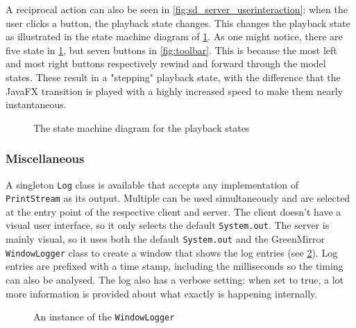 \documentclass[a4paper]{article}
\begin{document}
	A reciprocal action can also be seen in \cref{fig:sd_server_userinteraction}: when the user clicks a button, the playback state changes. This changes the playback state as illustrated in the state machine diagram of \cref{fig:smd_playbackstates}. As one might notice, there are five state in \cref{fig:smd_playbackstates}, but seven buttons in \cref{fig:toolbar}. This is because the most left and most right buttons respectively rewind and forward through the model states. These result in a "stepping" playback state, with the difference that the JavaFX transition is played with a highly increased speed to make them nearly instantaneous.
	\begin{figure}[H]
		\centering
		\caption{The state machine diagram for the playback states}
		\label{fig:smd_playbackstates}
	\end{figure}
	
	
	\subsubsection{Miscellaneous}\label{subsubsec:misc}
	A singleton \lstinline{Log} class is available that accepts any implementation of \lstinline{PrintStream} as its output. Multiple can be used simultaneously and are selected at the entry point of the respective client and server. The client doesn't have a visual user interface, so it only selects the default \lstinline{System.out}. The server is mainly visual, so it uses both the default \lstinline{System.out} and the GreenMirror \lstinline{WindowLogger} class to create a window that shows the log entries (see \cref{fig:log}). Log entries are prefixed with a time stamp, including the milliseconds so the timing can also be analysed. The log also has a verbose setting: when set to true, a lot more information is provided about what exactly is happening internally.
	\begin{figure}[H]
		\centering
		\caption{An instance of the \lstinline{WindowLogger}}
		\label{fig:log}
	\end{figure}
	
\end{document}
